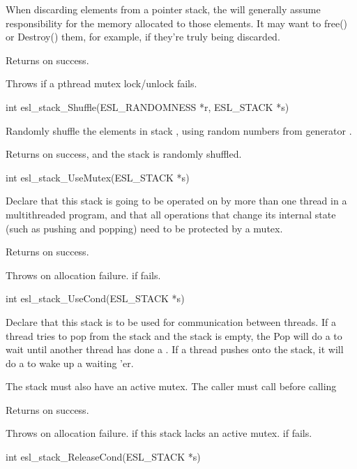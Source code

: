 \begin{sreapi}
When discarding elements from a pointer stack, the
 will generally assume responsibility
for the memory allocated to those elements. It may want
to free() or Destroy() them, for example, if they're
truly being discarded.

Returns  on success.

Throws  if a pthread mutex lock/unlock fails.


\hypertarget{func:esl_stack_Shuffle()}
{\item[int esl\_stack\_Shuffle(ESL\_RANDOMNESS *r, ESL\_STACK *s)]}

Randomly shuffle the elements in stack , using
random numbers from generator .

Returns  on success, and the stack is randomly 
shuffled.


\hypertarget{func:esl_stack_UseMutex()}
{\item[int esl\_stack\_UseMutex(ESL\_STACK *s)]}

Declare that this stack is going to be operated on by more
than one thread in a multithreaded program, and that all
operations that change its internal state (such as
pushing and popping) need to be protected by a mutex.

Returns  on success.

Throws  on allocation failure.
 if  fails.


\hypertarget{func:esl_stack_UseCond()}
{\item[int esl\_stack\_UseCond(ESL\_STACK *s)]}

Declare that this stack is to be used for communication
between threads. If a thread tries to pop from the stack
and the stack is empty, the Pop will do a 
to wait until another thread has done a . If a thread
pushes onto the stack, it will do a 
to wake up a waiting 'er.

The stack must also have an active mutex. The caller
must call  before calling

Returns  on success.

Throws  on allocation failure.
 if this stack lacks an active mutex.
 if  fails.


\hypertarget{func:esl_stack_ReleaseCond()}
{\item[int esl\_stack\_ReleaseCond(ESL\_STACK *s)]}


\end{sreapi}
